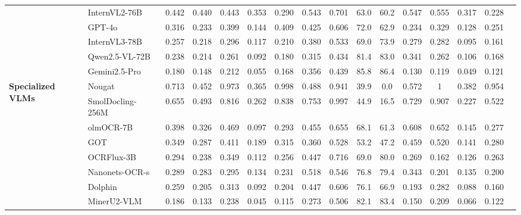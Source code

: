 \documentclass[11pt, a4paper,logo,  copyright, nonumbering]{paddleocr}
\begin{document}
\begin{table}[H]
{\begin{tabular}{l|l| c| cc|cc|cc|cc|cc|ccc}
    & InternVL2-76B~\cite{InternVL} & 0.442 & 0.440 & 0.443 & 0.353 & 0.290 & 0.543 & 0.701 & 63.0 & 60.2 & 0.547 & 0.555 & 0.317 & 0.228 \\
    & GPT-4o~\cite{achiam2023gpt} & 0.316 & 0.233 & 0.399 & 0.144 & 0.409 & 0.425 & 0.606 & 72.0 & 62.9 & 0.234 & 0.329 & 0.128 & 0.251 \\

    & InternVL3-78B~\cite{zhu2025internvl3} & 0.257 & 0.218 & 0.296 & 0.117 & 0.210 & 0.380 & 0.533 & 69.0 & 73.9 & 0.279 & 0.282 & 0.095 & 0.161 \\
   & Qwen2.5-VL-72B~\cite{bai2025qwen2} & 0.238 & 0.214 & 0.261 & 0.092 & 0.180 & 0.315 & 0.434 & 81.4 & 83.0 & 0.341 & 0.262 & 0.106 & 0.168 
    \\    & Gemini2.5-Pro~\cite{gemini25} & 0.180 & 0.148 & 0.212 & 0.055 & 0.168 & 0.356 & 0.439 & 85.8 & 86.4 & 0.130 & 0.119 & 0.049 & 0.121 \\
    \midrule
    \multirow{13}{*}{\textbf{Specialized VLMs}} 
        & Nougat~\cite{blecher2023nougat} & 0.713 & 0.452 & 0.973 & 0.365 & 0.998 & 0.488 & 0.941 & 39.9 & 0.0 & 0.572 & 1 & 0.382 & 0.954 \\
  
    & SmolDocling-256M~\cite{nassar2025smoldocling} & 0.655 & 0.493 & 0.816 & 0.262 & 0.838 & 0.753 & 0.997 & 44.9 & 16.5 & 0.729 & 0.907 & 0.227 & 0.522 \\
       & olmOCR-7B~\cite{poznanski2025olmocr} & 0.398 & 0.326 & 0.469 & 0.097 & 0.293 & 0.455 & 0.655 & 68.1 & 61.3 & 0.608 & 0.652 & 0.145 & 0.277 \\
 
     & GOT~\cite{wei2024general} & 0.349 & 0.287 & 0.411 & 0.189 & 0.315 & 0.360 & 0.528 & 53.2 & 47.2 & 0.459 & 0.520 & 0.141 & 0.280 \\
  & OCRFlux-3B~\cite{OCRFlux2025} & 0.294 & 0.238 & 0.349 & 0.112 & 0.256 & 0.447 & 0.716 & 69.0 & 80.0 & 0.269 & 0.162 & 0.126 & 0.263 \\
      & Nanonets-OCR-s~\cite{Nanonets-OCR-S} & 0.289 & 0.283 & 0.295 & 0.134 & 0.231 & 0.518 & 0.546 & 76.8 & 79.4 & 0.343 & 0.201 & 0.135 & 0.200 \\
    & Dolphin~\cite{feng2025dolphin} & 0.259 & 0.205 & 0.313 & 0.092 & 0.204 & 0.447 & 0.606 & 76.1 & 66.9 & 0.193 & 0.282 & 0.088 & 0.160 \\
    & MinerU2-VLM~\cite{MinerU2} & 0.186 & 0.133 & 0.238 & 0.045 & 0.115 & 0.273 & 0.506 & 82.1 & 83.4 & 0.150 & 0.209 & 0.066 & 0.122 \\


\end{tabular}}
\end{table}
\end{document}
